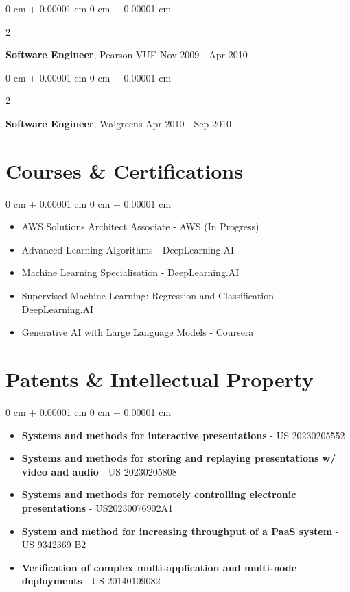 \documentclass[10pt, letterpaper]{article}
\newenvironment{highlights}{
    \begin{itemize}[
        topsep=0.10 cm,
        parsep=0.10 cm,
        partopsep=0pt,
        itemsep=0pt,
        leftmargin=0 cm + 10pt
    ]
}{
    \end{itemize}
} %
\newenvironment{onecolentry}{
    \begin{adjustwidth}{
        0 cm + 0.00001 cm
    }{
        0 cm + 0.00001 cm
    }
}{
    \end{adjustwidth}
} %
\newenvironment{twocolentry}[2][]{
    \onecolentry
    \def\secondColumn{#2}
    \setcolumnwidth{\fill, 4.5 cm}
    \begin{paracol}{2}
}{
    \switchcolumn \raggedleft \secondColumn
    \end{paracol}
    \endonecolentry
} %
\begin{document}
        \vspace{0.10 cm}
        \begin{twocolentry}{
            Nov 2009 - Apr 2010
        }
            \textbf{Software Engineer}, Pearson VUE\end{twocolentry}
        
        \vspace{0.10 cm}
        \begin{twocolentry}{
            Apr 2010 - Sep 2010
        }
            \textbf{Software Engineer}, Walgreens\end{twocolentry}

        \section{Courses \& Certifications}
        \vspace{0.10 cm}
        \begin{onecolentry}
            \begin{highlights}
                \item AWS Solutions Architect Associate - AWS (In Progress)
                \item Advanced Learning Algorithms - DeepLearning.AI
                \item Machine Learning Specialisation - DeepLearning.AI
                \item Supervised Machine Learning: Regression and Classification - DeepLearning.AI
                \item Generative AI with Large Language Models - Coursera
            \end{highlights}
        \end{onecolentry}

        \section{Patents \& Intellectual Property}
        \vspace{0.10 cm}
        \begin{onecolentry}
            \begin{highlights}
                \item \textbf{Systems and methods for interactive presentations} - US 20230205552
                \item \textbf{Systems and methods for storing and replaying presentations w/ video and audio} - US 20230205808
                \item \textbf{Systems and methods for remotely controlling electronic presentations} - US20230076902A1
                \item \textbf{System and method for increasing throughput of a PaaS system} - US 9342369 B2
                \item \textbf{Verification of complex multi-application and multi-node deployments} - US 20140109082
            \end{highlights}
        \end{onecolentry}
        
\end{document}
